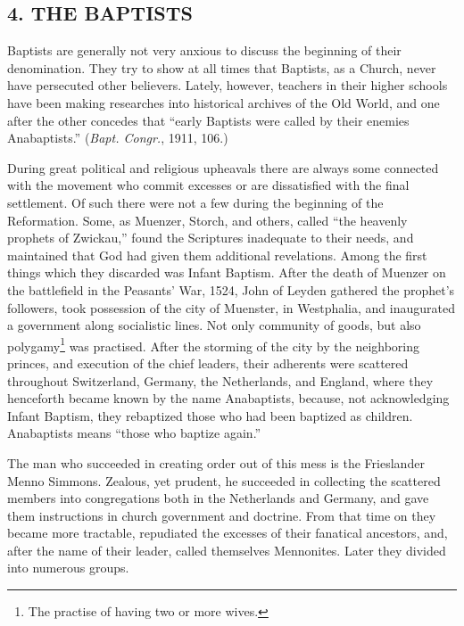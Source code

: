 \documentclass[
]{book}
\begin{document}
\hypertarget{the-baptists}{%
\subsection*{4. THE BAPTISTS}\label{the-baptists}}

Baptists are generally not very anxious to discuss the beginning of their denomination. They try to show at all times that Baptists, as a Church, never have persecuted other believers. Lately, however, teachers in their higher schools have been making researches into historical archives of the Old World, and one after the other concedes that ``early Baptists were called by their enemies Anabaptists.'' (\emph{Bapt. Congr.}, 1911, 106.)

During great political and religious upheavals there are always some connected with the movement who commit excesses or are dissatisfied with the final settlement. Of such there were not a few during the beginning of the Reformation. Some, as Muenzer, Storch, and others, called ``the heavenly prophets of Zwickau,'' found the Scriptures inadequate to their needs, and maintained that God had given them additional revelations. Among the first things which they discarded was Infant Baptism. After the death of Muenzer on the battlefield in the Peasants' War, 1524, John of Leyden gathered the prophet's followers, took possession of the city of Muenster, in Westphalia, and inaugurated a government along socialistic lines. Not only community of goods, but also polygamy\footnote{The practise of having two or more wives.} was practised. After the storming of the city by the neighboring princes, and execution of the chief leaders, their adherents were scattered throughout Switzerland, Germany, the Netherlands, and England, where they henceforth became known by the name Anabaptists, because, not acknowledging Infant Baptism, they rebaptized those who had been baptized as children. Anabaptists means ``those who baptize again.''

The man who succeeded in creating order out of this mess is the Frieslander Menno Simmons. Zealous, yet prudent, he succeeded in collecting the scattered members into congregations both in the Netherlands and Germany, and gave them instructions in church government and doctrine. From that time on they became more tractable, repudiated the excesses of their fanatical ancestors, and, after the name of their leader, called themselves Mennonites. Later they divided into numerous groups.
\end{document}
